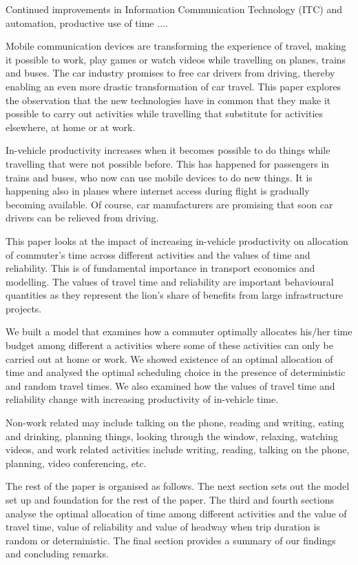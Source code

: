 \documentclass[12pt,a4paper,british]{article}
\begin{document}
Continued improvements in Information Communication Technology (ITC) and automation, productive use of time ....

Mobile communication devices are transforming the experience of travel, making it possible to work, play games or watch videos while travelling on planes, trains and buses. The car industry promises to free car drivers from driving, thereby enabling an even more drastic transformation of car travel. This paper explores the observation that the new technologies have in common that they make it possible to carry out activities while travelling that substitute for activities elsewhere, at home or at work.

In-vehicle productivity increases when it becomes possible to do things while travelling that were not possible before. This has happened for passengers in trains and buses, who now can use mobile devices  to do new things. It is happening also in planes where internet access during flight is gradually becoming available. Of course, car manufacturers are promising that soon car drivers can be relieved from driving.

This paper looks at the impact of increasing in-vehicle productivity on allocation of commuter's time across different activities and the values of time and reliability. This is of fundamental importance in transport economics and modelling. The values of travel time and reliability are important behavioural quantities as they represent the lion's share of benefits from large infrastructure projects.

We built a model that examines how a commuter optimally allocates his/her time budget among different a activities where some of these activities can only be carried out at home or work. We showed existence of an optimal allocation of time and analysed the optimal scheduling choice in the presence of deterministic and random travel times. We also examined how the values of travel time and reliability change with increasing productivity of in-vehicle time.

Non-work related may include talking on the phone, reading and writing, eating and drinking, planning things, looking through the window, relaxing, watching videos, and work related activities include writing, reading, talking on the phone, planning, video conferencing, etc.

The rest of the paper is organised as follows. The next section sets out the model set up and foundation for the rest of the paper. The third and fourth sections analyse the optimal allocation of time among different activities and the value of travel time, value of reliability and value of headway when trip duration is random or deterministic. The final section provides a summary of our findings and concluding remarks.
\end{document}
